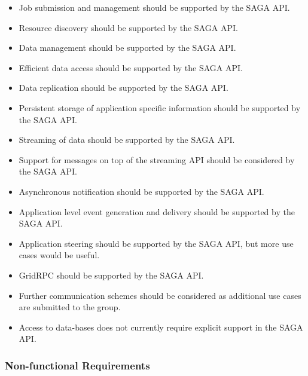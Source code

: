   \begin{itemize}

   \item{Job submission and management should be supported by the SAGA API.}

   \item{Resource discovery should be supported by the SAGA API.}

   \item{Data management should be supported by the SAGA API.}

   \item{Efficient data access should be supported by the SAGA API.}

   \item{Data replication should be supported by the SAGA API.}

   \item{Persistent storage of application specific information should
         be supported by the SAGA API.}

   \item{Streaming of data should be supported by the SAGA API.}

   \item{Support for messages on top of the streaming API should be
          considered by the SAGA API.}

   

   \item{Asynchronous notification should be supported by the SAGA API.}

   \item{Application level event generation and delivery should be
         supported by the SAGA API.}

   \item{Application steering should be supported by the SAGA API, but
         more use cases would be useful.}

   \item{GridRPC should be supported by the SAGA API.}

   \item{Further communication schemes should be considered as additional
         use cases are submitted to the group.}
       
     \item{Access to data-bases does not currently require explicit
         support in the SAGA API.}

  \end{itemize}

  \subsubsection*{Non-functional Requirements}

